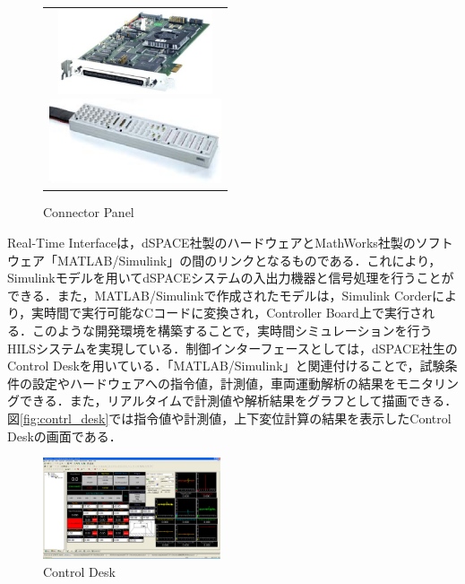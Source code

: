 \documentclass[a4paper,12pt]{article_vdlab_sotsuron}
\begin{document}
\vspace{10mm}
\begin{figure}[h]
    \begin{tabular}{c}
      \begin{minipage}{0.5\hsize}
	\begin{center}
	  \includegraphics[height=25mm]{figure/ds1104.eps}
	  \caption{Controller Borad\cite{dspace}}
	  \label{fig:ds1104}
	\end{center}
      \end{minipage}
      \begin{minipage}{0.5\hsize}
	\begin{center}
	  \includegraphics[height=25mm]{figure/conpane.eps}
	  \caption{Connector Panel\cite{dspace}}
	  \label{fig:conpane}
	\end{center}
      \end{minipage}
    \end{tabular}
\end{figure}

Real-Time Interfaceは，dSPACE社製のハードウェアとMathWorks社製のソフトウェア「MATLAB/Simulink」の間のリンクとなるものである．これにより，Simulinkモデルを用いてdSPACEシステムの入出力機器と信号処理を行うことができる．また，MATLAB/Simulinkで作成されたモデルは，Simulink Corderにより，実時間で実行可能なCコードに変換され，Controller Board上で実行される．このような開発環境を構築することで，実時間シミュレーションを行うHILSシステムを実現している．制御インターフェースとしては，dSPACE社生のControl Deskを用いている．「MATLAB/Simulink」と関連付けることで，試験条件の設定やハードウェアへの指令値，計測値，車両運動解析の結果をモニタリングできる．また，リアルタイムで計測値や解析結果をグラフとして描画できる．図\ref{fig:contrl_desk}では指令値や計測値，上下変位計算の結果を表示したControl Deskの画面である．

\vspace{10mm}
\begin{figure}[h]
 \centering
 \includegraphics[height=30mm]{figure/control_desk.eps}
 \vspace{2mm}
  \caption{Control Desk}
 \label{fig:control_desk}
\end{figure}
\end{document}
